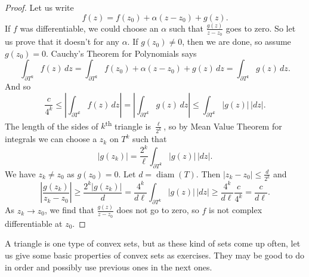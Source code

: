 \documentclass[12pt,openany]{book}
\newcommand{\sabs}[1]{\lvert {#1} \rvert}
\newcommand{\abs}[1]{\left\lvert {#1} \right\rvert}
\theoremstyle{plain}
\theoremstyle{remark}
\theoremstyle{definition}
\theoremstyle{exercise}
\theoremstyle{example}
\begin{document}
\begin{proof}
Let us write
\begin{equation*}
f(z) = f(z_0) + \alpha (z-z_0) + g(z) .
\end{equation*}
If $f$ was differentiable, we could choose an $\alpha$ such that
$\frac{g(z)}{z-z_0}$ goes to zero.
So let us prove that it doesn't for any $\alpha$.  If $g(z_0) \not= 0$,
then we are done, so assume $g(z_0) = 0$.
Cauchy's Theorem for Polynomials says
\begin{equation*}
\int_{\partial T^k} f(z) \, dz =
\int_{\partial T^k} f(z_0) + \alpha (z-z_0) + g(z) \, dz =
\int_{\partial T^k} g(z) \, dz .
\end{equation*}
And so
\begin{equation*}
\frac{c}{4^k} \leq
\abs{
\int_{\partial T^k} f(z) \, dz
} =
\abs{
\int_{\partial T^k} g(z) \, dz 
}
\leq
\int_{\partial T^k} \sabs{g(z)} \, \sabs{dz} .
\end{equation*}
The length of the sides of $k$\textsuperscript{th} triangle is
$\frac{\ell}{2^k}$, so
by Mean Value Theorem for integrals we can choose a $z_k$ on $T^k$ such that
\begin{equation*}
\sabs{g(z_k)} = 
\frac{2^k}{\ell}
\int_{\partial T^k} \sabs{g(z)} \, \sabs{dz} .
\end{equation*}
We have $z_k \not= z_0$ as $g(z_0)=0$.
Let $d = \operatorname{diam}(T)$.  Then
$\sabs{z_k-z_0} \leq \frac{d}{2^k}$ and
\begin{equation*}
\abs{\frac{g(z_k)}{z_k-z_0}}
\geq
\frac{2^k\sabs{g(z_k)}}{d}
=
\frac{4^k}{d \ell}
\int_{\partial T^k} \sabs{g(z)} \, \sabs{dz}
\geq
\frac{4^k}{d \ell}
\frac{c}{4^k} = \frac{c}{d \ell} .
\end{equation*}
As $z_k \to z_0$, we find that $\frac{g(z)}{z-z_0}$ does not 
go to zero, so $f$ is not complex differentiable at $z_0$.
\end{proof}

A triangle is one type of convex sets, but as these kind of sets come up
often, let us give some basic properties of convex sets as exercises.
They may be good to do in order and possibly use previous ones in the next
ones.
\end{document}
